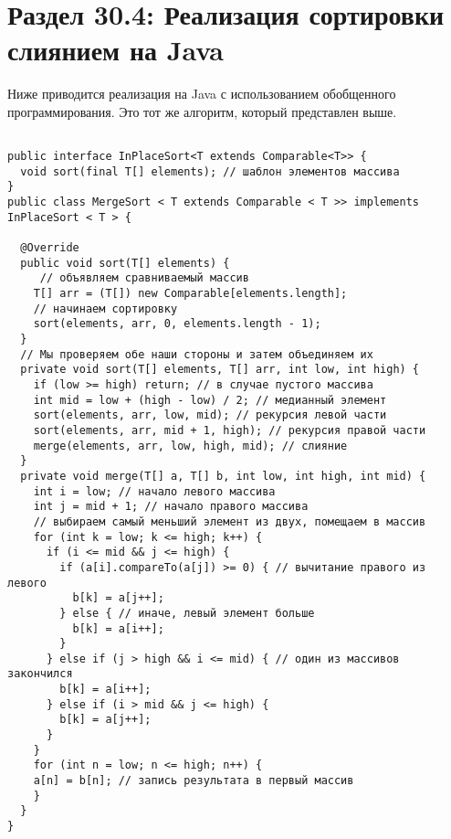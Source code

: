 \section*{Раздел 30.4: Реализация сортировки слиянием на Java}
Ниже приводится реализация на Java с использованием обобщенного программирования. Это тот же алгоритм, который представлен выше.\\
\begin{tcolorbox}
\begin{verbatim}

public interface InPlaceSort<T extends Comparable<T>> {
  void sort(final T[] elements); // шаблон элементов массива
}
public class MergeSort < T extends Comparable < T >> implements InPlaceSort < T > {

  @Override
  public void sort(T[] elements) {
     // объявляем сравниваемый массив
    T[] arr = (T[]) new Comparable[elements.length];
    // начинаем сортировку
    sort(elements, arr, 0, elements.length - 1);
  }
  // Мы проверяем обе наши стороны и затем объединяем их
  private void sort(T[] elements, T[] arr, int low, int high) {
    if (low >= high) return; // в случае пустого массива
    int mid = low + (high - low) / 2; // медианный элемент
    sort(elements, arr, low, mid); // рекурсия левой части
    sort(elements, arr, mid + 1, high); // рекурсия правой части
    merge(elements, arr, low, high, mid); // слияние
  }
  private void merge(T[] a, T[] b, int low, int high, int mid) {
    int i = low; // начало левого массива
    int j = mid + 1; // начало правого массива
    // выбираем самый меньший элемент из двух, помещаем в массив
    for (int k = low; k <= high; k++) {
      if (i <= mid && j <= high) {
        if (a[i].compareTo(a[j]) >= 0) { // вычитание правого из левого
          b[k] = a[j++];
        } else { // иначе, левый элемент больше
          b[k] = a[i++];
        }
      } else if (j > high && i <= mid) { // один из массивов закончился 
        b[k] = a[i++];
      } else if (i > mid && j <= high) {
        b[k] = a[j++];
      }
    }
    for (int n = low; n <= high; n++) {
    a[n] = b[n]; // запись результата в первый массив 
    }
  }
}
\end{verbatim}
\end{tcolorbox}
